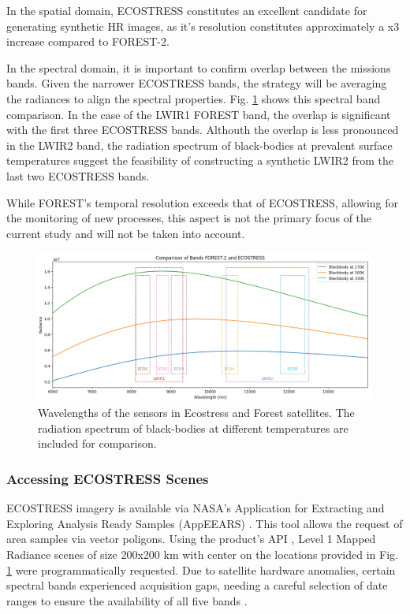 In the spatial domain, ECOSTRESS constitutes an excellent candidate for generating synthetic HR images, as it's resolution constitutes approximately a x3 increase compared to FOREST-2. 

In the spectral domain, it is important to confirm overlap between the missions bands. Given the narrower ECOSTRESS bands, the strategy will be averaging the radiances to align the spectral properties.
Fig. \ref{fig:5-wavelength-comparison} shows this spectral band comparison.
In the case of the LWIR1 FOREST band, the overlap is significant with the first three ECOSTRESS bands.
Althouth the overlap is less pronounced in the LWIR2 band, the radiation spectrum of black-bodies at prevalent surface temperatures suggest the feasibility of constructing a synthetic LWIR2 from the last two ECOSTRESS bands.

While FOREST's temporal resolution exceeds that of ECOSTRESS, allowing for the monitoring of new processes, this aspect is not the primary focus of the current study and will not be taken into account.



\begin{figure}[H]
    \centering
    \includegraphics[width=\linewidth]{Includes/5-wavelength-comparison.png}
    \caption{Wavelengths of the sensors in Ecostress and Forest satellites. The radiation spectrum of black-bodies at different temperatures are included for comparison.}
    \label{fig:5-wavelength-comparison}
\end{figure}

\subsubsection{Accessing ECOSTRESS Scenes}
    ECOSTRESS imagery is available via NASA's Application for Extracting and Exploring Analysis Ready Samples (AppEEARS) \cite{AppEEARS2023}. This tool allows the request of area samples via vector poligons. Using the product's API \cite{AppEEARSAPI2023}, Level 1 Mapped Radiance scenes of size 200x200 km  with center on the locations provided in Fig. \ref{fig:5-wavelength-comparison} were programmatically requested. Due to satellite hardware anomalies, certain spectral bands experienced acquisition gaps, needing a careful selection of date ranges to ensure the availability of all five bands \cite{ECO1BMAPRAD2023}.

